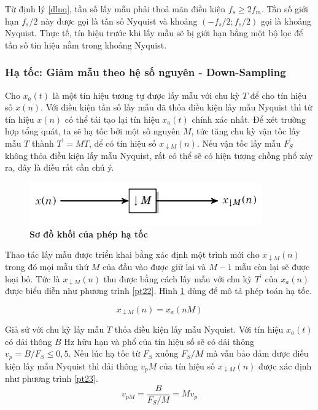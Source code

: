 Từ định lý \ref{dlnq}, tần số lấy mẫu phải thoả mãn điều kiện $f_s \geq 2f_m$. Tần số giới hạn $f_s/2$ này được gọi là tần số Nyquist và khoảng $(-f_s/2; f_s/2)$ gọi là khoảng Nyquist. Thực tế, tín hiệu trước khi lấy mẫu sẽ bị giới hạn bằng một bộ lọc để tần số tín hiệu nằm trong khoảng Nyquist.

\subsubsection{Hạ tốc: Giảm mẫu theo hệ số nguyên - Down-Sampling} \label{downsample}
Cho $x_a(t)$ là một tín hiệu tương tự được lấy mẫu với chu kỳ $T$
để cho tín hiệu số $x(n)$. Với điều kiện tần số lấy mẫu đã thỏa điều kiện lấy
mẫu Nyquist thì từ tín hiệu $x(n)$ có thể tái tạo lại tín hiệu $x_a(t)$ chính xác nhất. Để xét trường hợp tổng quát, ta sẽ hạ tốc bởi một số nguyên $M$, tức tăng chu kỳ vận tốc lấy mẫu $T$ thành $T^\prime=MT$, để có tín hiệu số $x_{\downarrow M}(n)$. Nếu vận tốc lấy mẫu $F^\prime_S$ không thỏa điều kiện lấy mẫu Nyquist, rất có thể sẽ có hiện tượng chồng phổ xảy ra, đây là điều rất cần chú ý. \cite{xulytinhieusobook}\cite{rao2018digital}

\begin{figure}[H]
    \centering
    \includegraphics[width=10cm]{Images/Chuong2/downsampling-top.png}
    \caption[Sơ đồ khối của phép hạ tốc]{\bfseries \fontsize{12pt}{0pt}\selectfont Sơ đồ khối của phép hạ tốc}
    \label{downsampling-top}
\end{figure}
Thao tác lấy mẫu được triển khai bằng xác định một trình mới cho $x_{\downarrow M}(n)$ trong đó mọi mẫu thứ $M$ của đầu vào được giữ lại và $M-1$ mẫu còn lại sẽ được loại bỏ. Tức là $x_{\downarrow M}(n)$ thu được bằng cách lấy mẫu với chu kỳ $T^\prime$ của $x_a(n)$ được biểu diễn như phương trình \ref{pt22}. Hình \ref{downsampling-top} dùng để mô tả phép toán hạ tốc.

\begin{equation} \label{pt22}
     x_{\downarrow M}(n) = x_a(nM)
\end{equation}

Giả sử với chu kỳ lấy mẫu $T$ thỏa điều kiện lấy mẫu Nyquist. Với tín hiệu $x_a(t)$ có dải thông $B$ Hz hữu hạn và phổ của tín hiệu số sẽ có dải thông $v_p = B/F_S \leq 0,5$. Nếu lúc hạ tốc từ $F_S$ xuống $F_S/M$ mà vẫn bảo đảm được điều kiện lấy mẫu Nyquist thì dải thông $v_pM$ của tín hiệu số $x_{\downarrow M}(n)$ được xác định như phương trình \ref{pt23}.
\begin{equation} \label{pt23}
     v_{pM} = \frac{B}{F_S/M} = Mv_p
\end{equation}


